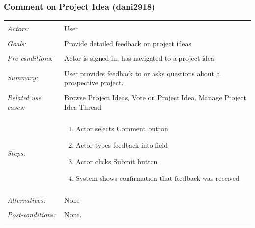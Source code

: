 \documentclass[11pt]{report}
\begin{document}
\subsubsection{Comment on Project Idea (dani2918)}
\begin{tabular}{ p{2cm} p{12cm} }
 \hline
 \\
 \textit{Actors:} & User \\ 
 \\
 \textit{Goals:} & Provide detailed feedback on project ideas  \\
 \\
 \textit{Pre-conditions:} & Actor is signed in, has navigated to a project idea  \\
 \\
 \textit{Summary:} &  User provides feedback to or asks questions about a prospective project. \\ 
 \\
 \textit{Related use cases:} & Browse Project Ideas, Vote on Project Idea, Manage Project Idea Thread \\ 
 \\
 \textit{Steps:} & \begin{enumerate}
  \item Actor selects Comment button
  \item Actor types feedback into field 
  \item Actor clicks Submit button
  \item System shows confirmation that feedback was received 
 \end{enumerate} \\
 \\
 \textit{Alternatives:} & None \\
 \\
 \textit{Post-conditions:} & None. \\
 \\
\hline 
\end{tabular}
\end{document}
